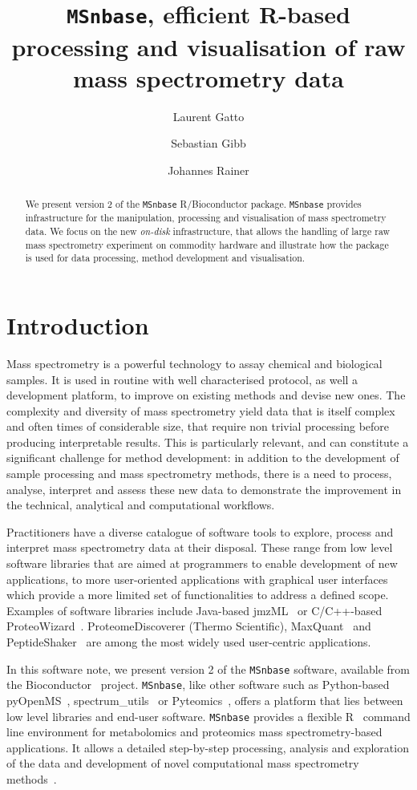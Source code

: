 \documentclass[journal=jacsat,manuscript=article]{achemso}\usepackage[]{graphicx}\usepackage[]{color}
\author{Laurent Gatto}
\affiliation[UCLouvain]{Computational Biology Unit, de Duve Institute, Universit\'e catholique de Louvain, Brussels, Belgium}
\author{Sebastian Gibb}
\affiliation[University of Greifswald]{Department of Anaesthesiology and Intensive Care of the University Medicine Greifswald, Germany}
\author{Johannes Rainer}
\affiliation[Eurac Research]{Institute for Biomedicine, Eurac Research, Affiliated Institute of the University of L\"ubeck, Bolzano, Italy}
\title[MSnbase version 2]
  {\texttt{MSnbase}, efficient R-based processing and visualisation of raw mass spectrometry data}
\begin{document}

\begin{abstract} %
  We present version 2 of the \texttt{MSnbase} R/Bioconductor
  package. \texttt{MSnbase} provides infrastructure for the
  manipulation, processing and visualisation of mass spectrometry
  data. We focus on the new \textit{on-disk} infrastructure, that
  allows the handling of large raw mass spectrometry experiment on
  commodity hardware and illustrate how the package is used for data
  processing, method development and visualisation.
\end{abstract}



\section{Introduction}

Mass spectrometry is a powerful technology to assay chemical and
biological samples. It is used in routine with well characterised
protocol, as well a development platform, to improve on existing
methods and devise new ones. The complexity and diversity of mass
spectrometry yield data that is itself complex and often times of
considerable size, that require non trivial processing before
producing interpretable results. This is particularly relevant, and
can constitute a significant challenge for method development: in
addition to the development of sample processing and mass spectrometry
methods, there is a need to process, analyse, interpret and assess
these new data to demonstrate the improvement in the technical,
analytical and computational workflows.

Practitioners have a diverse catalogue of software tools to explore,
process and interpret mass spectrometry data at their disposal. These
range from low level software libraries that are aimed at programmers
to enable development of new applications, to more user-oriented
applications with graphical user interfaces which provide a more
limited set of functionalities to address a defined scope. Examples of
software libraries include Java-based jmzML~\cite{Cote:2010} or
C/C++-based ProteoWizard~\cite{Chambers:2012}. ProteomeDiscoverer
(Thermo Scientific), MaxQuant~\cite{Cox:2008} and
PeptideShaker~\cite{Vaudel:2015} are among the most widely used
user-centric applications.

In this software note, we present version 2 of the \texttt{MSnbase}
\cite{Gatto:2012} software, available from the
Bioconductor~\cite{Huber:2015} project. \texttt{MSnbase}, like other
software such as Python-based {pyOpenMS}~\cite{Rost:2014},
spectrum\_utils~\cite{Bittremieux:2020} or
Pyteomics~\cite{Goloborodko:2013}, offers a platform that lies between
low level libraries and end-user software. \texttt{MSnbase} provides a
flexible R~\cite{R} command line environment for metabolomics and
proteomics mass spectrometry-based applications. It allows a detailed
step-by-step processing, analysis and exploration of the data and
development of novel computational mass spectrometry
methods~\cite{Stanstrup:2019}.
\end{document}
